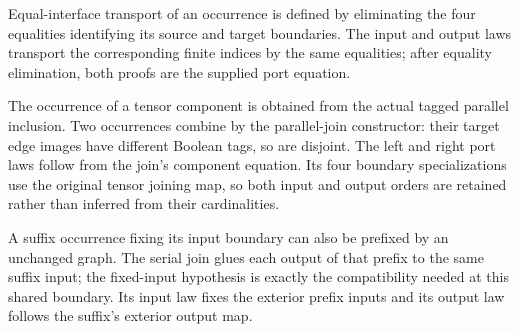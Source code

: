 Equal-interface transport of an occurrence is defined by eliminating the
four equalities identifying its source and target boundaries. The input and
output laws transport the corresponding finite indices by the same equalities;
after equality elimination, both proofs are the supplied port equation.




The occurrence of a tensor component is obtained from the actual tagged
parallel inclusion. Two occurrences combine by the parallel-join constructor:
their target edge images have different Boolean tags, so are disjoint. The
left and right port laws follow from the join's component equation. Its four
boundary specializations use the original tensor joining map, so both input
and output orders are retained rather than inferred from their cardinalities.









A suffix occurrence fixing its input boundary can also be prefixed by an
unchanged graph. The serial join glues each output of that prefix to the same
suffix input; the fixed-input hypothesis is exactly the compatibility needed
at this shared boundary. Its input law fixes the exterior prefix inputs and
its output law follows the suffix's exterior output map.

